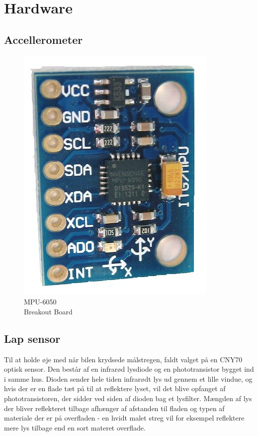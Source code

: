 \section{Hardware}

\subsection{Accellerometer}

\begin{figure}[h]
	\hfill\begin{minipage}{.3\textwidth}\centering
		\includegraphics[scale=0.2]{Billeder/mpu-6050.jpg}
		\caption{MPU-6050\\Breakout Board}
		\label{fig:MPU-6050-Breakout}
	\end{minipage}
\end{figure}

\subsection{Lap sensor}

Til at holde øje med når bilen krydsede målstregen, faldt valget på en CNY70 optisk sensor. Den består af en infrarød lysdiode og en phototransistor bygget ind i samme hus. Dioden sender hele tiden infrarødt lys ud gennem et lille vindue, og hvis der er en flade tæt på til at reflektere lyset, vil det blive opfanget af phototransistoren, der sidder ved siden af dioden bag et lysfilter. Mængden af lys der bliver reflekteret tilbage afhænger af afstanden til fladen og typen af materiale der er på overfladen - en hvidt malet streg vil for eksempel reflektere mere lys tilbage end en sort materet overflade.

